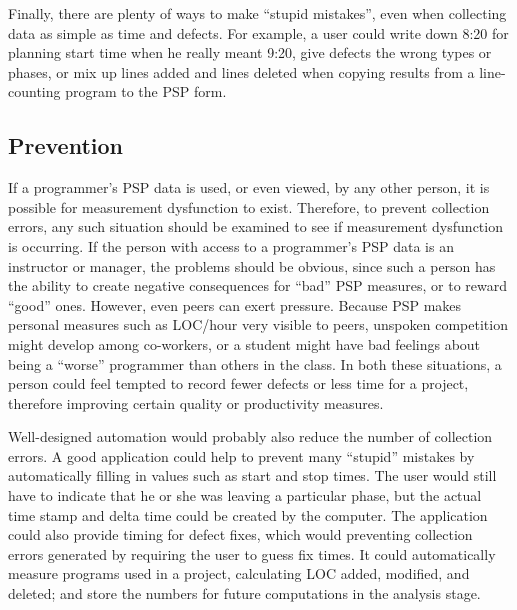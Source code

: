 Finally, there are plenty of ways to make ``stupid mistakes'', even when
collecting data as simple as time and defects.  For example, a user could
write down 8:20 for planning start time when he really meant 9:20, give
defects the wrong types or phases, or mix up lines added and lines deleted
when copying results from a line-counting program to the PSP form.

\subsection{Prevention}

If a programmer's PSP data is used, or even viewed, by any other person, it
is possible for measurement dysfunction to exist.  Therefore, to prevent
collection errors, any such situation should be examined to see if
measurement dysfunction is occurring.  If the person with access to a
programmer's PSP data is an instructor or manager, the problems should be
obvious, since such a person has the ability to create negative
consequences for ``bad'' PSP measures, or to reward ``good'' ones.
However, even peers can exert pressure.  Because PSP makes personal
measures such as LOC/hour very visible to peers, unspoken competition might
develop among co-workers, or a student might have bad feelings about being
a ``worse'' programmer than others in the class.  In both these situations, a
person could feel tempted to record fewer defects or less time for a
project, therefore improving certain quality or productivity measures.

Well-designed automation would probably also reduce the number of
collection errors.  A good application could help to prevent many
``stupid'' mistakes by automatically filling in values such as start and
stop times.  The user would still have to indicate that he or she was
leaving a particular phase, but the actual time stamp and delta time could
be created by the computer.  The application could also provide timing for
defect fixes, which would preventing collection errors generated by
requiring the user to guess fix times.  It could automatically measure
programs used in a project, calculating LOC added, modified, and deleted;
and store the numbers for future computations in the analysis stage.

